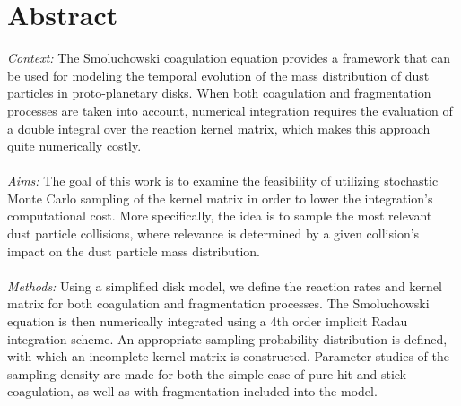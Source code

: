\cleardoublepage\chapter*{Abstract}
\thispagestyle{NoHeader}

\textit{Context:}
The Smoluchowski coagulation equation provides a framework that can be used for modeling the 
temporal evolution of the mass distribution of dust particles in proto-planetary disks.
When both coagulation and fragmentation processes are taken into account,
numerical integration requires the evaluation of a double integral over the 
reaction kernel matrix, which makes this approach quite numerically costly.
\\ \ \\
\textit{Aims:}
The goal of this work is to examine the feasibility of utilizing stochastic Monte Carlo sampling 
of the kernel matrix in order to lower the integration's computational cost.
More specifically, the idea is to sample the most relevant dust particle collisions,
where relevance is determined by a given collision's impact on the dust particle mass distribution.
\\ \ \\
\textit{Methods:}
Using a simplified disk model, we define the reaction rates and kernel matrix for 
both coagulation and fragmentation processes. The Smoluchowski equation is then numerically 
integrated using a 4th order implicit Radau integration scheme.
An appropriate sampling probability distribution is defined, 
with which an incomplete kernel matrix is constructed.
Parameter studies of the sampling density 
are made for both the simple case of pure hit-and-stick coagulation, as well as with 
fragmentation included into the model.
\\ \ \\
